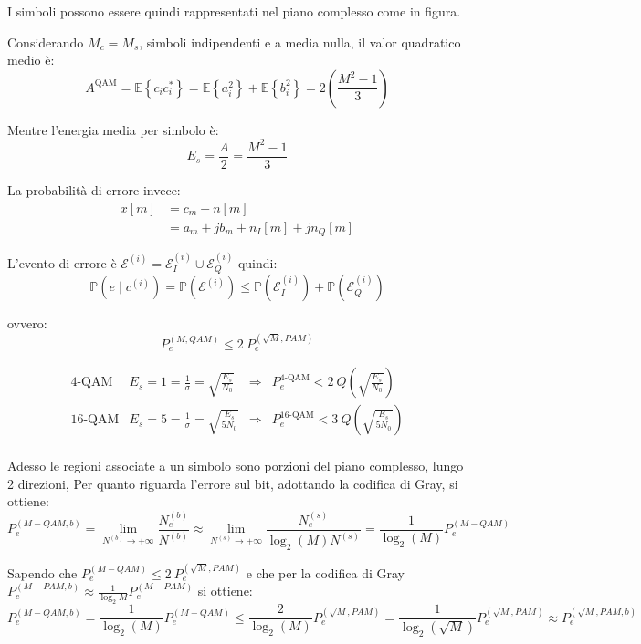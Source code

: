 I simboli possono essere quindi rappresentati nel piano complesso come in figura.

Considerando $M_c = M_s$, simboli indipendenti e a media nulla, il valor quadratico medio è:
\[
    A^{\text{QAM}} = \mathbb{E} \left\{  c_i c^*_i  \right\} = \mathbb{E} \left\{ a_i^2 \right\} + \mathbb{E} \left\{ b_i^2 \right\} = 2 \left( \frac{M^2 - 1}{3} \right)
\]

Mentre l'energia media per simbolo è:
\[
    E_s = \frac{A}{2} = \frac{M^2 - 1}{3}
\]

La probabilità di errore invece:
\begin{align*}
    x\left[ m \right] &= c_m + n \left[ m \right] \\
    &= a_m + j b_m + n_I \left[ m \right] + j n_Q \left[ m \right]
\end{align*}


L'evento di errore è $\mathcal{E}^{(i)} = \mathcal{E}_I^{(i)} \cup \mathcal{E}_Q^{(i)}$ quindi:
\[
    \mathbb{P} \left( e \mid c^{(i)} \right) = \mathbb{P} \left( \mathcal{E}^{(i)} \right) \leq \mathbb{P} \left( \mathcal{E}_I^{(i)} \right) + \mathbb{P} \left( \mathcal{E}_Q^{(i)} \right)
\]

ovvero:
\[
    P_e^{(M, QAM)} \leq 2 \ P_e^{(\sqrt{M}, PAM)}
\]





\[
\begin{array}{ccccc}
\text{4-QAM} & E_s = 1 = \frac{1}{\sigma} = \sqrt{\frac{E_s}{N_0}} & \Rightarrow & P_e^{\text{4-QAM}} < 2 \ Q\left(\sqrt{\frac{E_s}{N_0}}\right) \\
\text{16-QAM} & E_s = 5 = \frac{1}{\sigma} = \sqrt{\frac{E_s}{5N_0}} & \Rightarrow & P_e^{\text{16-QAM}} < 3 \ Q\left(\sqrt{\frac{E_s}{5N_0}}\right)\\
\end{array}
\]

Adesso le regioni associate a un simbolo sono porzioni del piano complesso, lungo 2 direzioni,
Per quanto riguarda l'errore sul bit, adottando la codifica di Gray, si ottiene:
\[
    P_e^{(M-QAM, b)} = \lim_{N^{(b)} \to +\infty} \frac{N_e^{(b)}}{N^{(b)}} \approx \lim_{N^{(s)} \to +\infty} \frac{N_e^{(s)}}{\log_2(M) N^{(s)}} = \frac{1}{\log_2(M)} P_e^{(M-QAM)} 
\]

Sapendo che $P_e^{(M-QAM)} \leq 2 \ P_e^{(\sqrt{M}, PAM)}$ e che per la codifica di Gray $P_e^{(M-PAM, b)} \approx \frac{1}{\log_2{M}} P_e^{(M-PAM)}$ si ottiene:
\[
     P_e^{(M-QAM, b)} = \frac{1}{\log_2(M)} P_e^{(M-QAM)} \leq \frac{2}{\log_2(M)} P_e^{(\sqrt{M}, PAM)} = \frac{1}{\log_2(\sqrt{M})} P_e^{(\sqrt{M}, PAM)} \approx P_e^{(\sqrt{M}, PAM, b)}
\]

